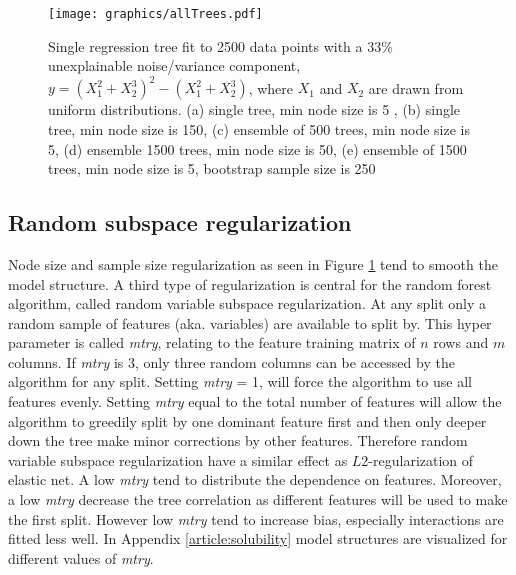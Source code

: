 \begin{figure}[!htbp]
\texttt{[image: graphics/allTrees.pdf]}
\caption{Single regression tree fit to 2500 data points with a 33\% unexplainable noise/variance component, $y=(X_1^2 + X_2^3)^2 - (X_1^2 + X_2^3)$, where $X_1$ and $X_2$ are drawn from uniform distributions. (a) single tree, min node size is 5 , (b) single tree, min node size is 150, (c) ensemble of 500 trees, min node size is 5, (d) ensemble 1500 trees, min node size is 50, (e) ensemble of 1500 trees, min node size is 5, bootstrap sample size is 250}
\label{allTrees}
\end{figure}

\subsection{Random subspace regularization}
Node size and sample size regularization as seen in Figure \ref{allTrees} tend to smooth the model structure. A third type of regularization is central for the random forest algorithm, called random variable subspace regularization. At any split only a random sample of features (aka. variables) are available to split by. This hyper parameter is called \textit{mtry}, relating to the feature training matrix of $n$ rows and $m$ columns. If \textit{mtry} is 3, only three random columns can be accessed by the algorithm for any split. Setting \textit{mtry} = 1, will force the algorithm to use all features evenly. Setting \textit{mtry} equal to the total number of features will allow the algorithm to greedily split by one dominant feature first and then only deeper down the tree make minor corrections by other features. Therefore random variable subspace regularization have a similar effect as $L2$-regularization of elastic net. A low \textit{mtry} tend to distribute the dependence on features. Moreover, a low \textit{mtry} decrease the tree correlation as different features will be used to make the first split. However low \textit{mtry} tend to increase bias, especially interactions are fitted less well. In Appendix \ref{article:solubility} model structures are visualized for different values of \textit{mtry}.

